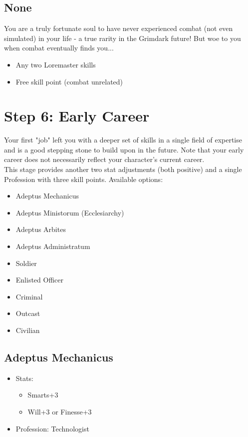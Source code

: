 \subsection{None}
You are a truly fortunate soul to have never experienced combat (not even simulated) in your life - a true rarity in the Grimdark future! But woe to you when combat eventually finds you...
\begin{itemize}
	\item Any two Loremaster skills
	\item Free skill point (combat unrelated)
\end{itemize}

\section{Step 6: Early Career} %
\label{sec:lifepath_6_early_career}
Your first "job" left you with a deeper set of skills in a single field of expertise and is a good stepping stone to build upon in the future. Note that your early career does not necessarily reflect your character's current career.\\
This stage provides another two stat adjustments (both positive) and a single Profession with three skill points.
Available options:
\begin{itemize}
	\item Adeptus Mechanicus
	\item Adeptus Ministorum (Ecclesiarchy)
	\item Adeptus Arbites
	\item Adeptus Administratum
	\item Soldier
	\item Enlisted Officer
	\item Criminal
	\item Outcast
	\item Civilian
\end{itemize}

\subsection{Adeptus Mechanicus}
\begin{itemize}
	\item Stats:
	\begin{itemize}
		\item Smarts+3
		\item Will+3 or Finesse+3
	\end{itemize}
	\item Profession: Technologist
\end{itemize}

